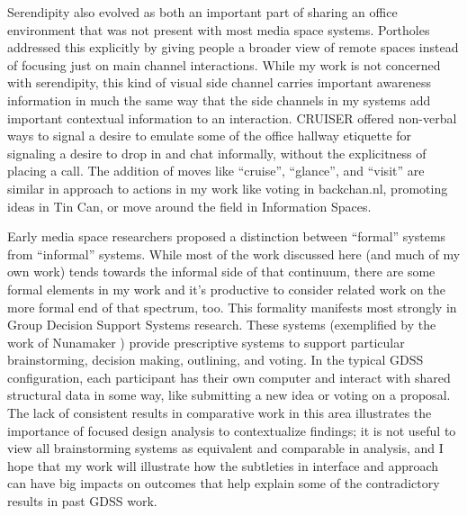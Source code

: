 \documentclass{tufte-handout}
\begin{document}


Serendipity also evolved as both an important part of sharing an office environment that was not present with most media space systems. Portholes \citep{Dourish:1992fu} addressed this explicitly by giving people a broader view of remote spaces instead of focusing just on main channel interactions. While my work is not concerned with serendipity, this kind of visual side channel carries important awareness information in much the same way that the side channels in my systems add important contextual information to an interaction. CRUISER \citep{Fish:1992vz} offered non-verbal ways to signal a desire to emulate some of the office hallway etiquette for signaling a desire to drop in and chat informally, without the explicitness of placing a call. The addition of moves like ``cruise'', ``glance'', and ``visit'' are similar in approach to actions in my work like voting in backchan.nl, promoting ideas in Tin Can, or move around the field in Information Spaces. 


Early media space researchers proposed a distinction between ``formal'' systems from ``informal'' systems. \citep{Olson:1991vz} While most of the work discussed here (and much of my own work) tends towards the informal side of that continuum, there are some formal elements in my work and it's productive to consider related work on the more formal end of that spectrum, too. This formality manifests most strongly in Group Decision Support Systems research. These systems (exemplified by the work of Nunamaker \citep{nunamaker_electronic_1991}) provide prescriptive systems to support particular brainstorming, decision making, outlining, and voting. In the typical GDSS configuration, each participant has their own computer and interact with shared structural data in some way, like submitting a new idea or voting on a proposal. The lack of consistent results in comparative work in this area \citep{Dennis:1988ww} illustrates the importance of focused design analysis to contextualize findings; it is not useful to view all brainstorming systems as equivalent and comparable in analysis, and I hope that my work will illustrate how the subtleties in interface and approach can have big impacts on outcomes that help explain some of the contradictory results in past GDSS work.

\end{document}
